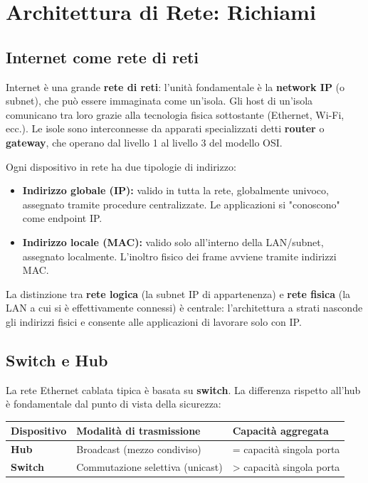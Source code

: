 \documentclass[12pt, a4paper]{report}
\begin{document}
\section{Architettura di Rete: Richiami}

\subsection{Internet come rete di reti}
Internet è una grande \textbf{rete di reti}: l'unità fondamentale è la \textbf{network IP} (o subnet), che può essere immaginata come un'isola. Gli host di un'isola comunicano tra loro grazie alla tecnologia fisica sottostante (Ethernet, Wi-Fi, ecc.). Le isole sono interconnesse da apparati specializzati detti \textbf{router} o \textbf{gateway}, che operano dal livello 1 al livello 3 del modello OSI.

Ogni dispositivo in rete ha due tipologie di indirizzo:
\begin{itemize}
	\item \textbf{Indirizzo globale (IP):} valido in tutta la rete, globalmente univoco, assegnato tramite procedure centralizzate. Le applicazioni si "conoscono" come endpoint IP.
	\item \textbf{Indirizzo locale (MAC):} valido solo all'interno della LAN/subnet, assegnato localmente. L'inoltro fisico dei frame avviene tramite indirizzi MAC.
\end{itemize}

La distinzione tra \textbf{rete logica} (la subnet IP di appartenenza) e \textbf{rete fisica} (la LAN a cui si è effettivamente connessi) è centrale: l'architettura a strati nasconde gli indirizzi fisici e consente alle applicazioni di lavorare solo con IP.

\subsection{Switch e Hub}
La rete Ethernet cablata tipica è basata su \textbf{switch}. La differenza rispetto all'hub è fondamentale dal punto di vista della sicurezza:

\begin{table}[H]
	\centering
	\begin{tabular}{|l|p{6cm}|p{5cm}|}
		\hline
		\textbf{Dispositivo} & \textbf{Modalità di trasmissione} & \textbf{Capacità aggregata} \\ \hline
		\textbf{Hub} & Broadcast (mezzo condiviso) & = capacità singola porta \\ \hline
		\textbf{Switch} & Commutazione selettiva (unicast) & > capacità singola porta \\ \hline
	\end{tabular}
\end{table}
\end{document}
